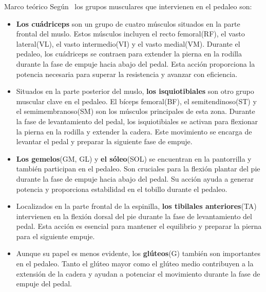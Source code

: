 \begin{thesischapter}{1} {Marco teórico}
    \vspace{10pt}
    Según~\cite{Losmúscu21} los grupos musculares que intervienen en el pedaleo son:

    \begin{itemize}
        \item \textbf{Los cuádriceps} son un grupo de cuatro músculos situados en la parte frontal del muslo. 
        Estos músculos incluyen el recto femoral(RF), el vasto lateral(VL), el vasto intermedio(VI) y el vasto medial(VM). Durante el pedaleo, los cuádriceps se contraen para extender la pierna en 
        la rodilla durante la fase de empuje hacia abajo del pedal. Esta acción proporciona la potencia necesaria para superar la resistencia y avanzar con eficiencia.
        
        \item Situados en la parte posterior del muslo, \textbf{los isquiotibiales} son otro grupo muscular clave en el pedaleo. El bíceps femoral(BF), 
        el semitendinoso(ST) y el semimembranoso(SM) son los músculos principales de esta zona. Durante la fase de levantamiento del pedal, los isquiotibiales se activan para flexionar la pierna en la rodilla y extender 
        la cadera. Este movimiento se encarga de levantar el pedal y preparar la siguiente fase de empuje.
        
        \item \textbf{Los gemelos}(GM, GL) y \textbf{el sóleo}(SOL) se encuentran en la pantorrilla y también participan en el pedaleo. Son cruciales para la flexión plantar del pie durante la fase de 
        empuje hacia abajo del pedal. Su acción ayuda a generar potencia y proporciona estabilidad en el tobillo durante el pedaleo.
        
        \item Localizados en la parte frontal de la espinilla, \textbf{los tibilales anteriores}(TA) intervienen en la flexión dorsal del pie durante la fase de levantamiento del pedal. Esta acción es 
        esencial para mantener el equilibrio y preparar la pierna para el siguiente empuje.
        
        \item Aunque su papel es menos evidente, los \textbf{glúteos}(G) también son importantes en el pedaleo. Tanto el glúteo mayor como el glúteo medio contribuyen a la extensión de la cadera y ayudan
         a potenciar el movimiento durante la fase de empuje del pedal.
    \end{itemize}



\end{thesischapter}
